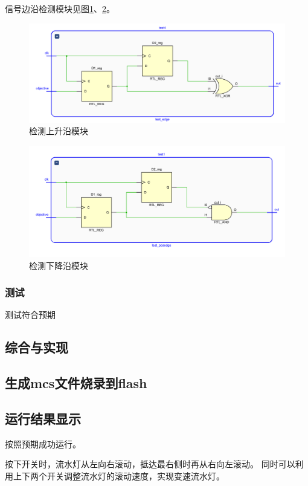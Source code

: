 \documentclass[UTF8]{article}
\begin{document}
信号边沿检测模块见图\ref{FIG.10}、\ref{FIG.11}。


\begin{figure}[H]
    \centering
    \includegraphics[width=\linewidth]{test_edge.PNG}
    \caption{检测上升沿模块}
    \label{FIG.10}
\end{figure}
\begin{figure}[H]
    \centering
    \includegraphics[width=\linewidth]{test_posedge.PNG}
    \caption{检测下降沿模块}
    \label{FIG.11}
\end{figure}

\subsubsection{测试}


测试符合预期

\subsection{综合与实现}
\subsection{生成mcs文件烧录到flash}
\subsection{运行结果显示}
按照预期成功运行。

按下开关时，流水灯从左向右滚动，抵达最右侧时再从右向左滚动。
同时可以利用上下两个开关调整流水灯的滚动速度，实现变速流水灯。
\end{document}
